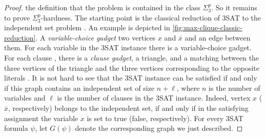 \documentclass[a4paper,abstracton]{scrartcl}
\begin{document}
\begin{proof}
 the definition that the problem is contained in the class $\Sigma_3^p$. So it remains to prove $\Sigma_3^p$-hardness. The starting point is the classical reduction of 3SAT to the independent set problem \cite{garey1979computers}. An example is depicted in \cref{fig:max-clique-classic-reduction}. A \emph{variable-choice gadget}  two vertices $x$ and $\overline x$ and an edge between them. For each variable in the 3SAT instance there is a variable-choice gadget. For each clause , there is a \emph{clause gadget},  a triangle, and a matching between the three vertices of the triangle and the three vertices corresponding to the opposite literals . It is not hard to see that the 3SAT instance can be satisfied if and only if this graph contains an independent set of size $n+\ell$, where $n$ is the number of variables and $\ell$ is the number of clauses in the 3SAT instance. Indeed, vertex $x$ ($\overline x$, respectively) belongs to the independent set, if and only if in the satisfying assignment the variable $x$ is set to true (false, respectively). For every 3SAT formula $\psi$, let $G(\psi)$ denote the corresponding graph we just described.


\end{proof}
\end{document}
